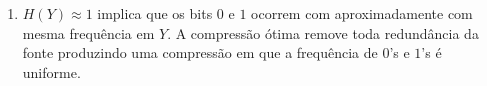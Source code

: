 \begin{enumerate}
    \item 
    $H(Y) \approx 1$ implica que os bits $0$ e $1$ ocorrem com aproximadamente com mesma frequência em $Y$. A compressão ótima remove toda redundância da fonte produzindo uma compressão em que a frequência de $0$'s e $1$'s é uniforme.

\end{enumerate}